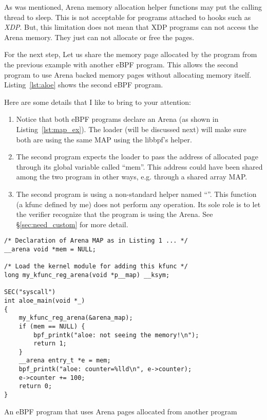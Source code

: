 \documentclass{article} \usepackage{graphicx}
\begin{document}
As was mentioned, Arena memory allocation helper functions may put the calling
thread to sleep. This is not acceptable for programs attached to hooks such as
\emph{XDP}. But, this limitation does not mean that XDP programs can not access
the Arena memory. They just can not allocate or free the pages.

For the next step, Let us share the memory page allocated by the program
from the previous example with another eBPF program. This allows the second
program to use Arena backed memory pages without allocating memory itself.
Listing~\ref{lst:aloe} shows the second eBPF program.

Here are some details that I like to bring to your attention:
\begin{enumerate}
    \item Notice that both eBPF programs declare an Arena (as shown in
        Listing~\ref{lst:map_ex}). The loader (will be discussed next) will
        make sure both are using the same MAP using the libbpf's
         helper.
    \item The second program expects the loader to pass the address of
        allocated page through its global variable called ``mem''. This address
        could have been shared among the two program in other ways, e.g.
        through a shared array MAP\@.
    \item The second program is using a non-standard helper named
        ``''. This function (a kfunc defined by me)
        does not perform any operation. Its sole role is to let the verifier
        recognize that the program is using the Arena. See
        \S\ref{sec:need_custom} for more detail.
\end{enumerate}

\begin{listing}
\begin{verbatim}
/* Declaration of Arena MAP as in Listing 1 ... */
__arena void *mem = NULL;

/* Load the kernel module for adding this kfunc */
long my_kfunc_reg_arena(void *p__map) __ksym;

SEC("syscall")
int aloe_main(void *_)
{
    my_kfunc_reg_arena(&arena_map);
    if (mem == NULL) {
        bpf_printk("aloe: not seeing the memory!\n");
        return 1;
    }
    __arena entry_t *e = mem;
    bpf_printk("aloe: counter=%lld\n", e->counter);
    e->counter += 100;
    return 0;
}
\end{verbatim}
\caption{An eBPF program that uses Arena pages allocated from another program}
\label{lst:aloe}
\end{listing}
\end{document}
